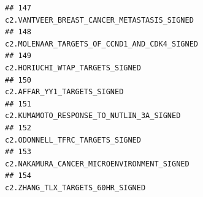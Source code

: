 \documentclass{article}\usepackage[]{graphicx}\usepackage[]{color}
\makeatletter
\newenvironment{kframe}{%
 \def\at@end@of@kframe{}%
 \ifinner\ifhmode%
  \def\at@end@of@kframe{\end{minipage}}%
  \begin{minipage}{\columnwidth}%
 \fi\fi%
 \def\FrameCommand##1{\hskip\@totalleftmargin \hskip-\fboxsep
 \colorbox{shadecolor}{##1}\hskip-\fboxsep
     \hskip-\linewidth \hskip-\@totalleftmargin \hskip\columnwidth}%
 \MakeFramed {\advance\hsize-\width
   \@totalleftmargin\z@ \linewidth\hsize
   \@setminipage}}%
 {\par\unskip\endMakeFramed%
 \at@end@of@kframe}
\newenvironment{knitrout}{}{} %
\makeatother
\begin{document}
\begin{knitrout}
\begin{kframe}
\begin{verbatim}
## 147                                                                                                                                                                                                                                                                                                           c2.VANTVEER_BREAST_CANCER_METASTASIS_SIGNED
## 148                                                                                                                                                                                                                                                                                                          c2.MOLENAAR_TARGETS_OF_CCND1_AND_CDK4_SIGNED
## 149                                                                                                                                                                                                                                                                                                                       c2.HORIUCHI_WTAP_TARGETS_SIGNED
## 150                                                                                                                                                                                                                                                                                                                           c2.AFFAR_YY1_TARGETS_SIGNED
## 151                                                                                                                                                                                                                                                                                                              c2.KUMAMOTO_RESPONSE_TO_NUTLIN_3A_SIGNED
## 152                                                                                                                                                                                                                                                                                                                       c2.ODONNELL_TFRC_TARGETS_SIGNED
## 153                                                                                                                                                                                                                                                                                                            c2.NAKAMURA_CANCER_MICROENVIRONMENT_SIGNED
## 154                                                                                                                                                                                                                                                                                                                      c2.ZHANG_TLX_TARGETS_60HR_SIGNED

\end{verbatim}
\end{kframe}
\end{knitrout}
\end{document}
